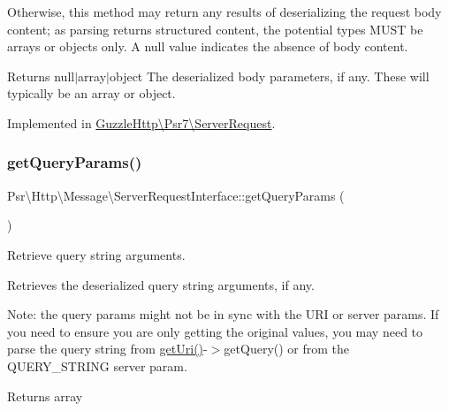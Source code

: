 Otherwise, this method may return any results of deserializing the request body content; as parsing returns structured content, the potential types M\+U\+ST be arrays or objects only. A null value indicates the absence of body content.

\begin{DoxyReturn}{Returns}
null$\vert$array$\vert$object The deserialized body parameters, if any. These will typically be an array or object. 
\end{DoxyReturn}


Implemented in \hyperlink{classGuzzleHttp_1_1Psr7_1_1ServerRequest_a1ba7206b9235bef8c1c615bcb6528aa6}{Guzzle\+Http\textbackslash{}\+Psr7\textbackslash{}\+Server\+Request}.

\mbox{\label{interfacePsr_1_1Http_1_1Message_1_1ServerRequestInterface_af4fa67cf103fab09a968c650abea76f2}} 
\subsubsection{\texorpdfstring{get\+Query\+Params()}{getQueryParams()}}
{\footnotesize\ttfamily Psr\textbackslash{}\+Http\textbackslash{}\+Message\textbackslash{}\+Server\+Request\+Interface\+::get\+Query\+Params (\begin{DoxyParamCaption}{ }\end{DoxyParamCaption})}

Retrieve query string arguments.

Retrieves the deserialized query string arguments, if any.

Note\+: the query params might not be in sync with the U\+RI or server params. If you need to ensure you are only getting the original values, you may need to parse the query string from {\ttfamily \hyperlink{interfacePsr_1_1Http_1_1Message_1_1RequestInterface_a179c55f570319eb0736f9a8209c9cac6}{get\+Uri()}-\/$>$get\+Query()} or from the {\ttfamily Q\+U\+E\+R\+Y\+\_\+\+S\+T\+R\+I\+NG} server param.

\begin{DoxyReturn}{Returns}
array 
\end{DoxyReturn}


